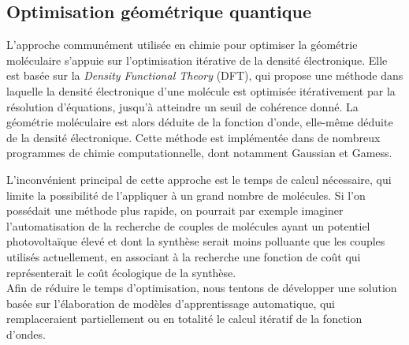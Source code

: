 \subsection{Optimisation géométrique quantique}
\par L'approche communément utilisée en chimie pour optimiser la géométrie moléculaire s'appuie sur l'optimisation itérative de la densité électronique. Elle est basée sur la \emph{Density Functional Theory} (DFT), qui propose une méthode dans laquelle la densité électronique d'une molécule est optimisée itérativement par la résolution d'équations, jusqu'à atteindre un seuil de cohérence donné. La géométrie moléculaire est alors déduite de la fonction d'onde, elle-même déduite de la densité électronique. Cette méthode est implémentée dans de nombreux programmes de chimie computationnelle, dont notamment Gaussian et Gamess.\\

\par L'inconvénient principal de cette approche est le temps de calcul nécessaire, qui limite la possibilité de l'appliquer à un grand nombre de molécules. Si l'on possédait une méthode plus rapide, on pourrait par exemple imaginer l'automatisation de la recherche de couples de molécules ayant un potentiel photovoltaïque élevé et dont la synthèse serait moins polluante que les couples utilisés actuellement, en associant à la recherche une fonction de coût qui représenterait le coût écologique de la synthèse.\\
Afin de réduire le temps d'optimisation, nous tentons de développer une solution basée sur l'élaboration de modèles d'apprentissage automatique, qui remplaceraient partiellement ou en totalité le calcul itératif de la fonction d'ondes.